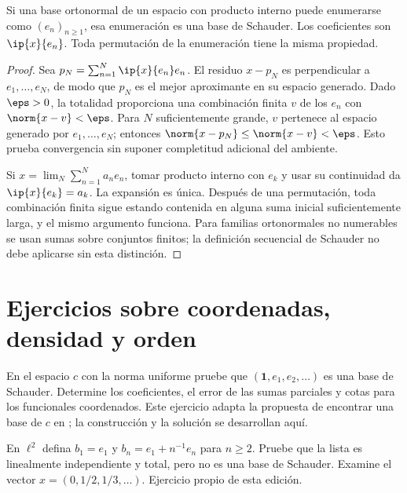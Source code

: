 \begin{proposicion}\label{ampl:schauder-ortonormal}
Si una base ortonormal de un espacio con producto interno puede enumerarse como $(e_n)_{n\ge1}$, esa enumeración es una base de Schauder. Los coeficientes son $\ip{x}{e_n}$. Toda permutación de la enumeración tiene la misma propiedad.
\end{proposicion}
\begin{proof}
Sea $p_N=\sum_{n=1}^N\ip{x}{e_n}e_n$. El residuo $x-p_N$ es perpendicular a $e_1,\ldots,e_N$, de modo que $p_N$ es el mejor aproximante en su espacio generado. Dado $\eps>0$, la totalidad proporciona una combinación finita $v$ de los $e_n$ con $\norm{x-v}<\eps$. Para $N$ suficientemente grande, $v$ pertenece al espacio generado por $e_1,\ldots,e_N$; entonces $\norm{x-p_N}\le\norm{x-v}<\eps$. Esto prueba convergencia sin suponer completitud adicional del ambiente.

Si $x=\lim_N\sum_{n=1}^Na_ne_n$, tomar producto interno con $e_k$ y usar su continuidad da $\ip{x}{e_k}=a_k$. La expansión es única. Después de una permutación, toda combinación finita sigue estando contenida en alguna suma inicial suficientemente larga, y el mismo argumento funciona. Para familias ortonormales no numerables se usan sumas sobre conjuntos finitos; la definición secuencial de Schauder no debe aplicarse sin esta distinción.
\end{proof}

\section{Ejercicios sobre coordenadas, densidad y orden}

\begin{ejercicio}\label{ej:ampl-schauder-1}
En el espacio $c$ con la norma uniforme pruebe que $(\mathbf1,e_1,e_2,\ldots)$ es una base de Schauder. Determine los coeficientes, el error de las sumas parciales y cotas para los funcionales coordenados. Este ejercicio adapta la propuesta de encontrar una base de $c$ en \cite{max-schauder}; la construcción y la solución se desarrollan aquí.
\end{ejercicio}


\begin{ejercicio}\label{ej:ampl-schauder-2}
En $\ell^2$ defina $b_1=e_1$ y $b_n=e_1+n^{-1}e_n$ para $n\ge2$. Pruebe que la lista es linealmente independiente y total, pero no es una base de Schauder. Examine el vector $x=(0,1/2,1/3,\ldots)$. Ejercicio propio de esta edición.
\end{ejercicio}


